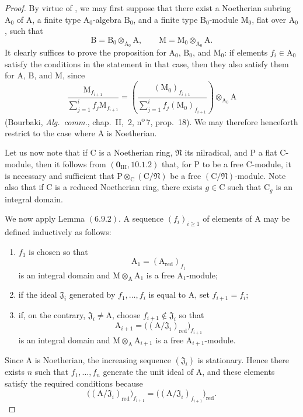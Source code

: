 \begin{proof}
By virtue of , we may first suppose that there exist a Noetherian subring $\mathrm{A}_0$ of $\mathrm{A}$, a finite type $\mathrm{A}_0$-algebra $\mathrm{B}_0$, and a finite type $\mathrm{B}_0$-module $\mathrm{M}_0$, flat over $\mathrm{A}_0$, such that
\[
  \mathrm{B}=\mathrm{B}_0\otimes_{\mathrm{A}_0}\mathrm{A},
  \qquad
  \mathrm{M}=\mathrm{M}_0\otimes_{\mathrm{A}_0}\mathrm{A}.
\]
It clearly suffices to prove the proposition for $\mathrm{A}_0$, $\mathrm{B}_0$, and $\mathrm{M}_0$: if elements $f_i\in\mathrm{A}_0$ satisfy the conditions in the statement in that case, then they also satisfy them for $\mathrm{A}$, $\mathrm{B}$, and $\mathrm{M}$, since
\[
  \frac{\mathrm{M}_{f_{i+1}}}
       {\sum_{j=1}^{i}f_j\mathrm{M}_{f_{i+1}}}
  =
  \left(
    \frac{(\mathrm{M}_0)_{f_{i+1}}}
         {\sum_{j=1}^{i}f_j(\mathrm{M}_0)_{f_{i+1}}}
  \right)\otimes_{\mathrm{A}_0}\mathrm{A}
\]
(Bourbaki, \emph{Alg.\ comm.}, chap.~II, \textsection\,2, n\textsuperscript{o}\,7, prop.~18). We may therefore henceforth restrict to the case where $\mathrm{A}$ is Noetherian.

Let us now note that if $\mathrm{C}$ is a Noetherian ring, $\mathfrak{N}$ its nilradical, and $\mathrm{P}$ a flat $\mathrm{C}$-module, then it follows from $(\mathbf{0}_{\mathrm{III}},10.1.2)$ that, for $\mathrm{P}$ to be a free $\mathrm{C}$-module,  it is necessary and sufficient that $\mathrm{P}\otimes_\mathrm{C}(\mathrm{C}/\mathfrak{N})$ be a free $(\mathrm{C}/\mathfrak{N})$-module. Note also that if $\mathrm{C}$ is a reduced Noetherian ring, there exists $g\in\mathrm{C}$ such that $\mathrm{C}_g$ is an integral domain.

We now apply Lemma $(6.9.2)$. A sequence $(f_i)_{i\geqslant1}$ of elements of $\mathrm{A}$ may be defined inductively as follows:
\begin{enumerate}
\item[$1^\circ$] $f_1$ is chosen so that
\[
  \mathrm{A}_1=(\mathrm{A}_{\mathrm{red}})_{f_1}
\]
is an integral domain and $\mathrm{M}\otimes_\mathrm{A}\mathrm{A}_1$ is a free $\mathrm{A}_1$-module;
\item[$2^\circ$] if the ideal $\mathfrak{J}_i$ generated by $f_1,\ldots,f_i$ is equal to $\mathrm{A}$, set $f_{i+1}=f_i$;
\item[$3^\circ$] if, on the contrary, $\mathfrak{J}_i\neq\mathrm{A}$, choose $f_{i+1}\notin\mathfrak{J}_i$ so that
\[
  \mathrm{A}_{i+1}
  =\bigl((\mathrm{A}/\mathfrak{J}_i)_{\mathrm{red}}\bigr)_{f_{i+1}}
\]
is an integral domain and $\mathrm{M}\otimes_\mathrm{A}\mathrm{A}_{i+1}$ is a free $\mathrm{A}_{i+1}$-module.
\end{enumerate}
Since $\mathrm{A}$ is Noetherian, the increasing sequence $(\mathfrak{J}_i)$ is stationary. Hence there exists $n$ such that $f_1,\ldots,f_n$ generate the unit ideal of $\mathrm{A}$, and these elements satisfy the required conditions because
\[
  \bigl((\mathrm{A}/\mathfrak{J}_i)_{\mathrm{red}}\bigr)_{f_{i+1}}
  =
  \bigl((\mathrm{A}/\mathfrak{J}_i)_{f_{i+1}}\bigr)_{\mathrm{red}}.
\]
\end{proof}

